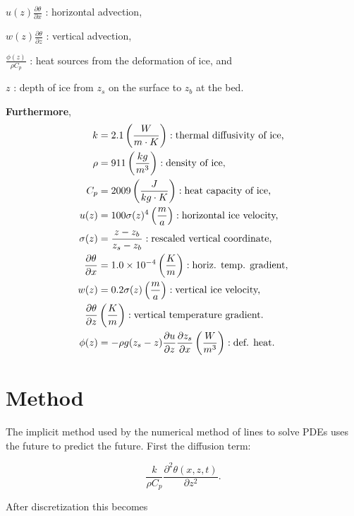 \documentclass{article}%
\begin{document}
$u(z) \frac{\partial \theta}{\partial x}$ : horizontal advection,

$w(z) \frac{\partial \theta}{\partial z}$ : vertical advection, 

$\frac{\phi(z)}{\rho C_p}$ : heat sources from the deformation of ice, and

$z$ : depth of ice from $z_s$ on the surface to $z_b$ at the bed.

\noindent \textbf{Furthermore},
\begin{align*}
  k &= 2.1 \left( \frac {W}{m\cdot K} \right): 
    \textnormal{thermal diffusivity of ice,}
  \\
  \rho &= 911 \left( \frac {kg}{m^3}\right) : 
    \textnormal{density of ice,}
  \\
  C_p &= 2009 \left( \frac{J}{kg \cdot K}\right) : 
    \textnormal{heat capacity of ice,}
  \\
  u(z) &= 100\sigma(z)^4 \left( \frac ma\right) : 
    \textnormal{horizontal ice velocity,}
  \\
  \sigma(z) &= \frac{z - z_b}{z_s - z_b} : 
    \textnormal{rescaled vertical coordinate,}
  \\
  \frac{\partial \theta}{\partial x} &= 1.0\times 10^{-4} 
    \left( \frac Km \right) : 
    \textnormal{horiz. temp. gradient,}
  \\
  w(z) &= 0.2\sigma(z) \left( \frac ma\right) : 
    \textnormal{vertical ice velocity,}
  \\
  \frac{\partial \theta}{\partial z}& \left( \frac Km\right) : 
    \textnormal{vertical temperature gradient.}
  \\
  \phi(z) &= -\rho g (z_s - z) \frac{\partial u}{\partial z} 
  \frac{\partial z_s}{\partial x} \left( \frac{W}{m^3}\right) : 
  \textnormal{def. heat.}
  \\
\end{align*}


\section{Method}

The implicit method used by the numerical method of lines to solve PDEs uses the future to predict the future.  First the diffusion term:

$$\frac{k}{\rho C_p} \frac{\partial ^2 \theta(x, z, t)}{\partial z^2}.$$

\noindent After discretization this becomes
\end{document}
